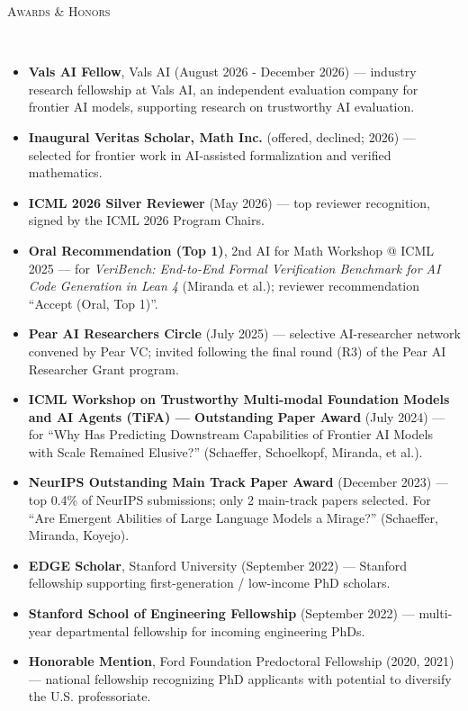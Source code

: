 \documentclass{article}
\newenvironment{changemargin}[2]{%
  \begin{list}{}{%
    \setlength{\topsep}{0pt}%
    \setlength{\leftmargin}{#1}%
    \setlength{\rightmargin}{#2}%
    \setlength{\listparindent}{\parindent}%
    \setlength{\itemindent}{\parindent}%
    \setlength{\parsep}{\parskip}%
  }%
  \item[]}{\end{list}
}
\newcommand{\lineover}{
	\begin{changemargin}{-0.05in}{-0.05in}
		\vspace*{-8pt}
		\hrulefill \\
		\vspace*{-2pt}
	\end{changemargin}
}
\newcommand{\header}[1]{
	\begin{changemargin}{-0.5in}{-0.5in}
		\scshape{#1}\\
  	\lineover
	\end{changemargin}
	\nopagebreak[4]    %
}
\newenvironment{body} {
		\vspace*{-16pt}
		\begin{changemargin}{-0.25in}{-0.5in}
	  }
		{\end{changemargin}\vspace{8pt plus 12pt}
	}
\begin{document}
\header{Awards \& Honors}
\begin{body}
\vspace{12pt}
\begin{itemize} \itemsep -2pt
    \item \textbf{Vals AI Fellow}, Vals AI (August 2026 - December 2026) --- industry research fellowship at Vals AI, an independent evaluation company for frontier AI models, supporting research on trustworthy AI evaluation.
    \item \textbf{Inaugural Veritas Scholar, Math Inc.} (offered, declined; 2026) --- selected for frontier work in AI-assisted formalization and verified mathematics.
    \item \textbf{ICML 2026 Silver Reviewer} (May 2026) --- top reviewer recognition, signed by the ICML 2026 Program Chairs.
    \item \textbf{Oral Recommendation (Top 1)}, 2nd AI for Math Workshop @ ICML 2025 --- for \textit{VeriBench: End-to-End Formal Verification Benchmark for AI Code Generation in Lean 4} (Miranda et al.); reviewer recommendation ``Accept (Oral, Top 1)''.
    \item \textbf{Pear AI Researchers Circle} (July 2025) --- selective AI-researcher network convened by Pear VC; invited following the final round (R3) of the Pear AI Researcher Grant program.
    \item \textbf{ICML Workshop on Trustworthy Multi-modal Foundation Models and AI Agents (TiFA) --- Outstanding Paper Award} (July 2024) --- for ``Why Has Predicting Downstream Capabilities of Frontier AI Models with Scale Remained Elusive?'' (Schaeffer, Schoelkopf, Miranda, et al.).
    \item \textbf{NeurIPS Outstanding Main Track Paper Award} (December 2023) --- top 0.4\% of NeurIPS submissions; only 2 main-track papers selected. For ``Are Emergent Abilities of Large Language Models a Mirage?'' (Schaeffer, Miranda, Koyejo).
    \item \textbf{EDGE Scholar}, Stanford University (September 2022) --- Stanford fellowship supporting first-generation / low-income PhD scholars.
    \item \textbf{Stanford School of Engineering Fellowship} (September 2022) --- multi-year departmental fellowship for incoming engineering PhDs.
    \item \textbf{Honorable Mention}, Ford Foundation Predoctoral Fellowship (2020, 2021) --- national fellowship recognizing PhD applicants with potential to diversify the U.S. professoriate.

\end{itemize}
\end{body}
\end{document}
